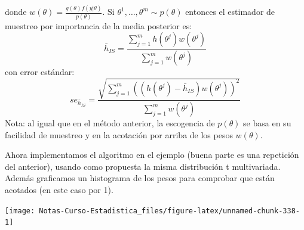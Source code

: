 \documentclass[
  12pt,
]{book}
\newenvironment{Shaded}{\begin{snugshade}}{\end{snugshade}}
\newcommand{\AttributeTok}[1]{\textcolor[rgb]{0.77,0.63,0.00}{#1}}
\newcommand{\ConstantTok}[1]{\textcolor[rgb]{0.00,0.00,0.00}{#1}}
\newcommand{\DecValTok}[1]{\textcolor[rgb]{0.00,0.00,0.81}{#1}}
\newcommand{\FunctionTok}[1]{\textcolor[rgb]{0.00,0.00,0.00}{#1}}
\newcommand{\NormalTok}[1]{#1}
\newcommand{\OtherTok}[1]{\textcolor[rgb]{0.56,0.35,0.01}{#1}}
\newcommand{\SpecialCharTok}[1]{\textcolor[rgb]{0.00,0.00,0.00}{#1}}
\theoremstyle{definition}
\theoremstyle{definition}
\theoremstyle{definition}
\theoremstyle{definition}
\theoremstyle{remark}
\begin{document}
donde \(w(\theta)=\frac{g(\theta)f(y|\theta)}{p(\theta)}\). Si \(\theta^1,\ldots,\theta^{m}\sim p(\theta)\) entonces el estimador de muestreo por importancia de la media posterior es:
\[\bar h_{IS}=\frac{\sum_{j=1}^mh(\theta^j)w(\theta^j)}{\sum_{j=1}^mw(\theta^j)}\]
con error estándar:
\[se_{\bar h_{IS}}=\frac{\sqrt{\sum_{j=1}^m((h(\theta^j)-\bar h_{IS})w(\theta^j))^2}}{\sum_{j=1}^mw(\theta^j)}\]
Nota: al igual que en el método anterior, la escogencia de \(p(\theta)\) se basa en su facilidad de muestreo y en la acotación por arriba de los pesos \(w(\theta)\).

Ahora implementamos el algoritmo en el ejemplo (buena parte es una repetición del anterior), usando como propuesta la misma distribución t multivariada. Además graficamos un histograma de los pesos para comprobar que están acotados (en este caso por 1).

\begin{Shaded}
\end{Shaded}

\begin{center}\texttt{[image: Notas-Curso-Estadistica\_files/figure-latex/unnamed-chunk-338-1]} \end{center}
\end{document}
